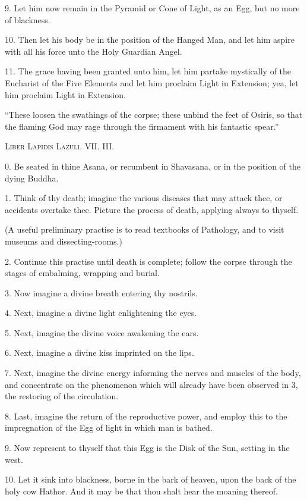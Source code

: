 9. Let him now remain in the Pyramid or Cone of Light, as an Egg, but no more of blackness.

10. Then let his body be in the position of the Hanged Man, and let him aspire with all his force unto the Holy Guardian Angel.

11. The grace having been granted unto him, let him partake mystically of the Eucharist of the Five Elements and let him proclaim Light in Extension; yea, let him proclaim Light in Extension.


\pagebreak



\epigraph{\enquote{These loosen the swathings of the corpse; these unbind the feet of Osiris, so that the flaming God may rage through the firmament with his fantastic spear.}}{\textsc{Liber Lapidis Lazuli. VII. III.}}


0. Be seated in thine Asana, or recumbent in Shavasana, or in the position of the dying Buddha.

1. Think of thy death; imagine the various diseases that may attack thee, or accidents overtake thee. Picture the process of death, applying always to thyself.

(A useful preliminary practise is to read textbooks of Pathology, and to visit museums and dissecting-rooms.)

2. Continue this practise until death is complete; follow the corpse through the stages of embalming, wrapping and burial.

3. Now imagine a divine breath entering thy nostrils.

4. Next, imagine a divine light enlightening the eyes.

5. Next, imagine the divine voice awakening the ears.

6. Next, imagine a divine kiss imprinted on the lips.

7. Next, imagine the divine energy informing the nerves and muscles of the body, and concentrate on the phenomenon which will already have been observed in 3, the restoring of the circulation.

8. Last, imagine the return of the reproductive power, and employ this to the impregnation of the Egg of light in which man is bathed.

9. Now represent to thyself that this Egg is the Disk of the Sun, setting in the west.

10. Let it sink into blackness, borne in the bark of heaven, upon the back of the holy cow Hathor. And it may be that thou shalt hear the moaning thereof.

